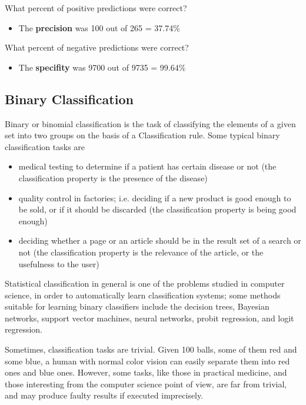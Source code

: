 \documentclass[a4paper,12pt]{article}
\begin{document}
What percent of positive predictions were correct?

\begin{itemize}
\item The \textbf{precision} was 100 out of 265 = 37.74\%
\end{itemize}

What percent of negative predictions were correct?

\begin{itemize}
\item The \textbf{specifity} was 9700 out of 9735 = 99.64\%
\end{itemize}




\subsection{Binary Classification}

Binary or binomial classification is the task of classifying the elements of a given set into two groups on the basis of a Classification rule. Some typical binary classification tasks are

\begin{itemize}
	\item medical testing to determine if a patient has certain disease or not (the classification property is the presence of the disease)
	\item quality control in factories; i.e. deciding if a new product is good enough to be sold, or if it should be discarded (the classification property is being good enough)
	\item deciding whether a page or an article should be in the result set of a search or not (the classification property is the relevance of the article, or the usefulness to the user)
\end{itemize}
Statistical classification in general is one of the problems studied in computer science, in order to automatically learn classification systems; some methods suitable for learning binary classifiers include the decision trees, Bayesian networks, support vector machines, neural networks, probit regression, and logit regression.

Sometimes, classification tasks are trivial. Given 100 balls, some of them red and some blue, a human with normal color vision can easily separate them into red ones and blue ones. However, some tasks, like those in practical medicine, and those interesting from the computer science point of view, are far from trivial, and may produce faulty results if executed imprecisely.
\end{document}
